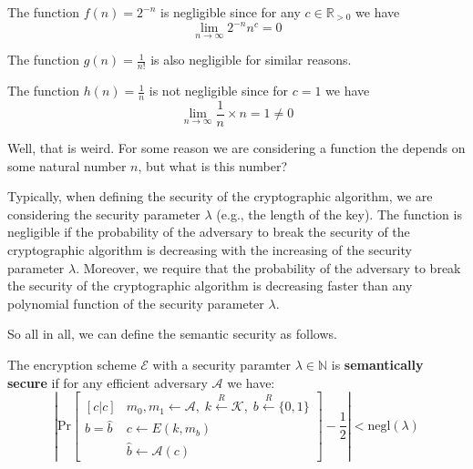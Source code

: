 \documentclass[../lecture-notes.tex]{subfiles}
\begin{document}
\begin{example}
    The function $f(n) = 2^{-n}$ is negligible since for any $c \in \mathbb{R}_{>0}$ we have
    \begin{equation*}
        \lim_{n \to \infty} 2^{-n}n^c = 0
    \end{equation*}

    The function $g(n) = \frac{1}{n!}$ is also negligible for similar reasons.
\end{example}

\begin{example}
    The function $h(n) = \frac{1}{n}$ is not negligible since for $c = 1$ we have
    \begin{equation*}
        \lim_{n \to \infty} \frac{1}{n} \times n = 1 \neq 0
    \end{equation*}
\end{example}

Well, that is weird. For some reason we are considering a function the depends on some natural number $n$, but what is this number?

Typically, when defining the security of the cryptographic algorithm, we are considering the security parameter $\lambda$ (e.g., the length of the key). The function is negligible if the probability of the adversary to break the security of the cryptographic algorithm is decreasing with the increasing of the security parameter $\lambda$. Moreover, we require that the probability of the adversary to break the security of the cryptographic algorithm is decreasing faster than any polynomial function of the security parameter $\lambda$.

So all in all, we can define the semantic security as follows.

\begin{definition}
    The encryption scheme $\mathcal{E}$ with a security paramter $\lambda \in \mathbb{N}$ is \textbf{semantically secure} if for any efficient adversary $\mathcal{A}$ we have:
    \begin{equation*}
        \left|\text{Pr}\begin{bmatrix}[c|c]
            & m_0, m_1 \gets \mathcal{A}, \; k \xleftarrow{R} \mathcal{K}, \; b \xleftarrow{R} \{0,1\} \\
            b = \hat{b} & c \gets E(k,m_b) \\
            &\hat{b} \gets \mathcal{A}(c)
        \end{bmatrix} - \frac{1}{2}\right| < \text{negl}(\lambda)
    \end{equation*}
\end{definition}
\end{document}
